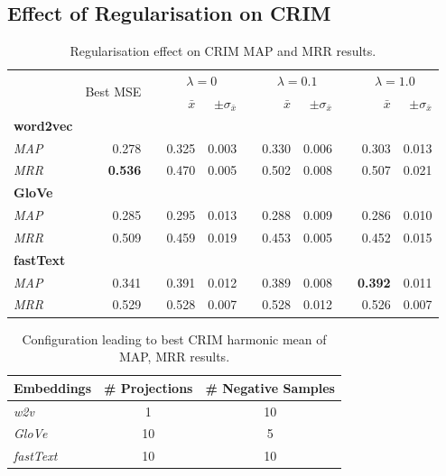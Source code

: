 \subsection{Effect of Regularisation on CRIM}
\begin{table}\centering
\begin{tabular}{@{}lrcrrcrrcrr@{}}\toprule
& \multirow{2}{*}{Best MSE} & \phantom{a} &  \multicolumn{2}{c}{$\lambda=0$} & \phantom{a} & \multicolumn{2}{c}{$\lambda=0.1$} & \phantom{a} & \multicolumn{2}{c}{$\lambda=1.0$}\\
\cmidrule{4-5} \cmidrule{7-8} \cmidrule{10-11}
&  && $\bar{x}$ & $\pm\sigma_{\bar{x}}$ && $\bar{x}$ & $\pm\sigma_{\bar{x}}$ && $\bar{x}$ & $\pm\sigma_{\bar{x}}$ \\ \midrule
\textbf{word2vec} \\
\textit{MAP} & 0.278 && 0.325 & 0.003 && 0.330 & 0.006 && 0.303 & 0.013 \\
\textit{MRR} & \textbf{0.536} && 0.470 & 0.005 && 0.502 & 0.008 && 0.507 & 0.021 \\
\cmidrule{2-11}
\textbf{GloVe} \\
\textit{MAP} & 0.285 && 0.295 & 0.013 && 0.288 & 0.009 && 0.286 & 0.010 \\
\textit{MRR} & 0.509 && 0.459 & 0.019 && 0.453 & 0.005 && 0.452 & 0.015 \\
\cmidrule(lr){2-11}
\textbf{fastText} \\
\textit{MAP} & 0.341 && 0.391 & 0.012 && 0.389 & 0.008 && \textbf{0.392} & 0.011 \\
\textit{MRR} & 0.529 && 0.528 & 0.007 && 0.528 & 0.012 && 0.526 & 0.007 \\
\bottomrule
\end{tabular}
\caption{Regularisation effect on CRIM MAP and MRR results.}\label{tab:crim_regularised}
\end{table}

\begin{table}\centering
\begin{tabular}{@{}lcc@{}}\toprule
\textbf{Embeddings} & \textbf{\# Projections} & \textbf{\# Negative Samples}\\
\midrule
\textit{w2v} & 1 & 10\\
\textit{GloVe} & 10 & 5\\
\textit{fastText} & 10 & 10\\
\bottomrule
\end{tabular}
\caption{Configuration leading to best CRIM harmonic mean of MAP, MRR results.}\label{tab:crim_best_parameter_combination}
\end{table}


